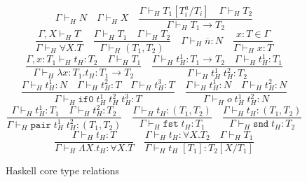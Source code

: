 \begin{figure}
\[
\Gamma\vdash_{H}N
\quad
\Gamma\vdash_{H}X
\quad
\frac{\Gamma\vdash_{H}T_{1}[T^{a}_{i}/T_{i}]\quad\Gamma\vdash_{H}T_{2}}{\Gamma\vdash_{H}T_{1}\rightarrow T_{2}}
\]
\[
\frac{\Gamma ,X\vdash_{H}T}{\Gamma\vdash_{H}\forall X.T}
\quad
\frac{\Gamma\vdash_{H}T_{1}\quad\Gamma\vdash_{H}T_{2}}{\Gamma\vdash_{H}(T_{1},T_{2})}
\quad
\Gamma\vdash_{H}\overline{n}:N
\quad
\frac{x:T\in\Gamma}{\Gamma\vdash_{H}x:T}
\]
\[
\frac{\Gamma,x:T_{1}\vdash_{H}t_{H}:T_{2}\quad\Gamma\vdash_{H}T_{1}}{\Gamma\vdash_{H}\lambda x:T_{1}.t_{H}:T_{1}\rightarrow T_{2}}
\quad
\frac{\Gamma\vdash_{H}t_{H}^{1}:T_{1}\rightarrow T_{2}\quad\Gamma\vdash_{H}t_{H}^{1}:T_{1}}{\Gamma\vdash_{H}t_{H}^{1}\;t_{H}^{2}:T_{2}}
\]
\[
\frac{\Gamma\vdash_{H}t_{H}^{1}:N\quad\Gamma\vdash_{H}t_{H}^{2}:T\quad\Gamma\vdash_{H}t_{H}^{3}:T}{\Gamma\vdash_{H}\mathtt{if0}\;t_{H}^{1}\;t_{H}^{2}\;t_{H}^{3}:T}
\quad
\frac{\Gamma\vdash_{H}t_{H}^{1}:N\quad\Gamma\vdash_{H}t_{H}^{2}:N}{\Gamma\vdash_{H}o\;t_{H}^{1}\;t_{H}^{2}:N}
\]
\[
\frac{\Gamma\vdash_{H}t_{H}^{1}:T_{1}\quad\Gamma\vdash_{H}t_{H}^{2}:T_{2}}{\Gamma\vdash_{H}\mathtt{pair}\;t_{H}^{1}\;t_{H}^{2}:(T_{1},T_{2})}
\quad
\frac{\Gamma\vdash_{H}t_{H}:(T_{1},T_{2})}{\Gamma\vdash_{H}\mathtt{fst}\;t_{H}:T_{1}}
\quad
\frac{\Gamma\vdash_{H}t_{H}:(T_{1},T_{2})}{\Gamma\vdash_{H}\mathtt{snd}\;t_{H}:T_{2}}
\]
\[
\frac{\Gamma\vdash_{H}t_{H}:T}{\Gamma\vdash_{H}\Lambda X.t_{H}:\forall X.T}
\quad
\frac{\Gamma\vdash_{H}t_{H}:\forall X.T_{2}\quad\Gamma\vdash_{H}T_{1}}{\Gamma\vdash_{H}t_{H}\;[T_{1}]:T_{2}[X/T_{1}]}
\]
\caption{Haskell core type relations}
\label{hctr}
\end{figure}